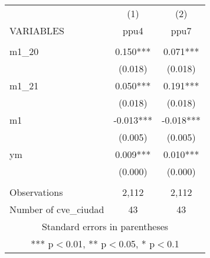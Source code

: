 \begin{tabular}{lcc} \hline
 & (1) & (2) \\
VARIABLES & ppu4 & ppu7 \\ \hline
 &  &  \\
m1\_20 & 0.150*** & 0.071*** \\
 & (0.018) & (0.018) \\
m1\_21 & 0.050*** & 0.191*** \\
 & (0.018) & (0.018) \\
m1 & -0.013*** & -0.018*** \\
 & (0.005) & (0.005) \\
ym & 0.009*** & 0.010*** \\
 & (0.000) & (0.000) \\
 &  &  \\
Observations & 2,112 & 2,112 \\
 Number of cve\_ciudad & 43 & 43 \\ \hline
\multicolumn{3}{c}{ Standard errors in parentheses} \\
\multicolumn{3}{c}{ *** p$<$0.01, ** p$<$0.05, * p$<$0.1} \\
\end{tabular}

